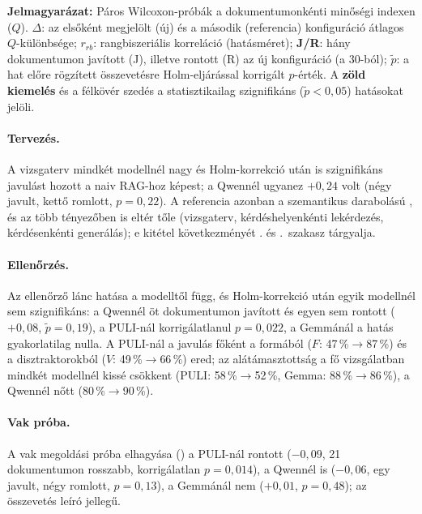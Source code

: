 \begin{table}[htbp]
\vspace{4pt}
\begin{minipage}{\textwidth}
\footnotesize\noindent\textbf{Jelmagyarázat:}
Páros Wilcoxon-próbák a dokumentumonkénti minőségi indexen ($Q$).
$\Delta$: az elsőként megjelölt (új) és a második (referencia) konfiguráció átlagos $Q$-különbsége;
$r_{rb}$: rangbiszeriális korreláció (hatásméret);
\textbf{J/R}: hány dokumentumon javított (J), illetve rontott (R) az új konfiguráció (a 30-ból);
$\tilde p$: a hat előre rögzített összevetésre Holm-eljárással korrigált $p$-érték.
A \setlength{\fboxsep}{1.5pt}\colorbox[HTML]{E6F4EA}{\textbf{zöld kiemelés}} és a félkövér szedés a statisztikailag szignifikáns ($\tilde p < 0{,}05$) hatásokat jelöli.
\end{minipage}
\end{table}

\paragraph{Tervezés.} A vizsgaterv mindkét modellnél nagy és Holm-korrekció után is szignifikáns javulást hozott
a naiv RAG-hoz képest; a Qwennél ugyanez $+0{,}24$ volt (négy javult, kettő romlott, $p=0{,}22$). A referencia
azonban a szemantikus darabolású , és az  több tényezőben is eltér tőle (vizsgaterv,
kérdéshelyenkénti lekérdezés, kérdésenkénti generálás); e kitétel következményét \az{\ref{sec:fo-robusztus}}. és
\az{\ref{sec:hipotezis-ertekeles}}.~szakasz tárgyalja.

\paragraph{Ellenőrzés.} Az ellenőrző lánc hatása a modelltől függ, és Holm-korrekció után egyik modellnél sem
szignifikáns: a Qwennél öt dokumentumon javított és egyen sem rontott ($+0{,}08$, $\tilde p=0{,}19$), a
PULI-nál korrigálatlanul $p=0{,}022$, a Gemmánál a hatás gyakorlatilag nulla. A PULI-nál a javulás főként a
formából ($F$: 47\,\%$\to$87\,\%) és a disztraktorokból ($V$: 49\,\%$\to$66\,\%) ered; az alátámasztottság a fő
vizsgálatban mindkét modellnél kissé csökkent (PULI: 58\,\%$\to$52\,\%, Gemma: 88\,\%$\to$86\,\%), a Qwennél
nőtt (80\,\%$\to$90\,\%).

\paragraph{Vak próba.} A vak megoldási próba elhagyása () a PULI-nál rontott ($-0{,}09$, 21
dokumentumon rosszabb, korrigálatlan $p=0{,}014$), a Qwennél is ($-0{,}06$, egy javult, négy romlott,
$p=0{,}13$), a Gemmánál nem ($+0{,}01$, $p=0{,}48$); az összevetés leíró jellegű.

